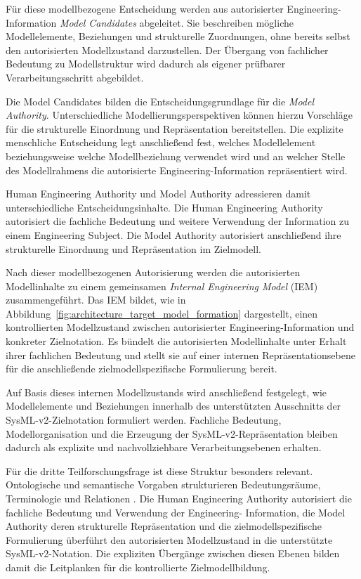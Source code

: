 Für diese modellbezogene Entscheidung werden aus autorisierter
Engineering-Information \emph{Model Candidates} abgeleitet. Sie beschreiben
mögliche Modellelemente, Beziehungen und strukturelle Zuordnungen, ohne
bereits selbst den autorisierten Modellzustand darzustellen. Der Übergang von
fachlicher Bedeutung zu Modellstruktur wird dadurch als eigener prüfbarer
Verarbeitungsschritt abgebildet.

Die Model Candidates bilden die Entscheidungsgrundlage für die
\emph{Model Authority}. Unterschiedliche Modellierungsperspektiven können
hierzu Vorschläge für die strukturelle Einordnung und Repräsentation
bereitstellen. Die explizite menschliche Entscheidung legt anschließend fest,
welches Modellelement beziehungsweise welche Modellbeziehung verwendet wird
und an welcher Stelle des Modellrahmens die autorisierte
Engineering-Information repräsentiert wird.

Human Engineering Authority und Model Authority adressieren damit
unterschiedliche Entscheidungsinhalte. Die Human Engineering Authority
autorisiert die fachliche Bedeutung und weitere Verwendung der Information zu
einem Engineering Subject. Die Model Authority autorisiert anschließend ihre
strukturelle Einordnung und Repräsentation im Zielmodell.

Nach dieser modellbezogenen Autorisierung werden die autorisierten
Modellinhalte zu einem gemeinsamen \emph{Internal Engineering Model} (IEM)
zusammengeführt. Das IEM bildet, wie in
Abbildung~\ref{fig:architecture_target_model_formation} dargestellt, einen
kontrollierten Modellzustand zwischen autorisierter Engineering-Information
und konkreter Zielnotation. Es bündelt die autorisierten Modellinhalte unter
Erhalt ihrer fachlichen Bedeutung und stellt sie auf einer internen
Repräsentationsebene für die anschließende zielmodellspezifische Formulierung
bereit.

Auf Basis dieses internen Modellzustands wird anschließend festgelegt, wie
Modellelemente und Beziehungen innerhalb des unterstützten Ausschnitts der
SysML-v2-Zielnotation formuliert werden. Fachliche Bedeutung,
Modellorganisation und die Erzeugung der SysML-v2-Repräsentation bleiben
dadurch als explizite und nachvollziehbare Verarbeitungsebenen erhalten.

Für die dritte Teilforschungsfrage ist diese Struktur besonders relevant.
Ontologische und semantische Vorgaben strukturieren Bedeutungsräume,
Terminologie und Relationen
\cite{OrellanaMandrick2019,Lu2022,Dong2026}. Die Human Engineering Authority
autorisiert die fachliche Bedeutung und Verwendung der Engineering-
Information, die Model Authority deren strukturelle Repräsentation und die
zielmodellspezifische Formulierung überführt den autorisierten Modellzustand
in die unterstützte SysML-v2-Notation. Die expliziten Übergänge zwischen
diesen Ebenen bilden damit die Leitplanken für die kontrollierte
Zielmodellbildung.

